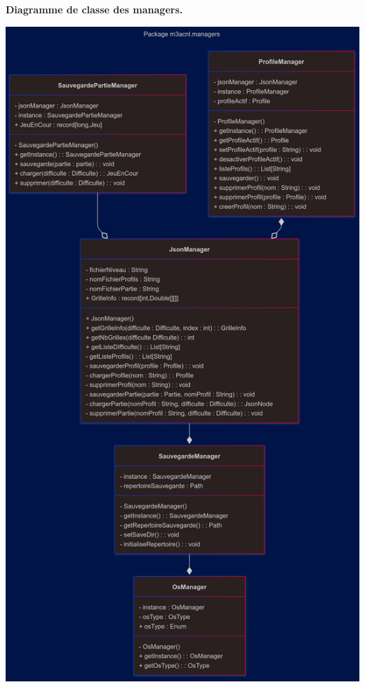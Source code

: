 \textbf{Diagramme de classe des managers.}\\
\begin{center}
    \includegraphics[width=\textwidth,height=\dimexpr\textheight-40pt\relax,keepaspectratio]{../Annexe/classes/managers.png}
\end{center}

\pagebreak


